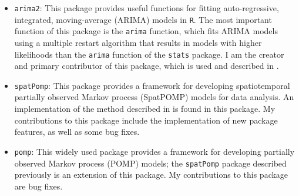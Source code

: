 \documentclass{article}
\begin{document}
\begin{itemize}
    \item \texttt{arima2}: This package provides useful functions for fitting auto-regressive, integrated, moving-average (ARIMA) models in \texttt{R}. The most important function of this package is the \texttt{arima} function, which fits ARIMA models using a multiple restart algorithm that results in models with higher likelihoods than the \texttt{arima} function of the \texttt{stats} package.
    I am the creator and primary contributor of this package, which is used and described in \cite{wheeler2023-a}. 
    \item \texttt{spatPomp}: This package provides a framework for developing spatiotemporal partially observed Markov process (SpatPOMP) models for data analysis. An implementation of the method described in \cite{ionides22} is found in this package. 
    My contributions to this package include the implementation of new package features, as well as some bug fixes. 

    \item \texttt{pomp}: This widely used package provides a framework for developing partially observed Markov process (POMP) models; the \texttt{spatPomp} package described previously is an extension of this package.
    My contributions to this package are bug fixes. 
\end{itemize}



\end{document}
